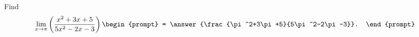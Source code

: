 \documentclass{ximera}
\author{Gregory Hartman \and Matthew Carr}
\begin{document}
\begin{exercise}




Find 
\[
\lim_{x\to\pi}\left({\frac{x^2+3x+5}{5x^2-2x-3}}\right)
\begin{prompt}
= \answer{\frac{\pi^2+3\pi+5}{5\pi^2-2\pi-3}}.
\end{prompt}
\]

\end{exercise}
\end{document}
